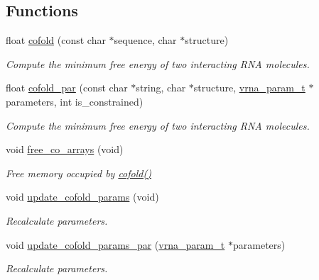 \subsection*{Functions}
\begin{DoxyCompactItemize}
\item 
float \mbox{\hyperlink{group__mfe__global__deprecated_gabc8517f22cfe70595ee81fc837910d52}{cofold}} (const char $\ast$sequence, char $\ast$structure)
\begin{DoxyCompactList}\small\item\em Compute the minimum free energy of two interacting R\+NA molecules. \end{DoxyCompactList}\item 
float \mbox{\hyperlink{group__mfe__global__deprecated_ga7612cfeeb1b793f1e4179b1eb53df1f3}{cofold\+\_\+par}} (const char $\ast$string, char $\ast$structure, \mbox{\hyperlink{group__energy__parameters_ga8a69ca7d787e4fd6079914f5343a1f35}{vrna\+\_\+param\+\_\+t}} $\ast$parameters, int is\+\_\+constrained)
\begin{DoxyCompactList}\small\item\em Compute the minimum free energy of two interacting R\+NA molecules. \end{DoxyCompactList}\item 
void \mbox{\hyperlink{group__mfe__global__deprecated_gaafb33d7473eb9af9d1b168ca8761c41a}{free\+\_\+co\+\_\+arrays}} (void)
\begin{DoxyCompactList}\small\item\em Free memory occupied by \mbox{\hyperlink{group__mfe__global__deprecated_gabc8517f22cfe70595ee81fc837910d52}{cofold()}} \end{DoxyCompactList}\item 
void \mbox{\hyperlink{group__mfe__global__deprecated_ga4fcbf34e77b99bfbb2333d2ab0c41a57}{update\+\_\+cofold\+\_\+params}} (void)
\begin{DoxyCompactList}\small\item\em Recalculate parameters. \end{DoxyCompactList}\item 
void \mbox{\hyperlink{group__mfe__global__deprecated_gaaadbd28b4e428710529ab4098fdacad3}{update\+\_\+cofold\+\_\+params\+\_\+par}} (\mbox{\hyperlink{group__energy__parameters_ga8a69ca7d787e4fd6079914f5343a1f35}{vrna\+\_\+param\+\_\+t}} $\ast$parameters)
\begin{DoxyCompactList}\small\item\em Recalculate parameters. \end{DoxyCompactList}\item 

\end{DoxyCompactItemize}
